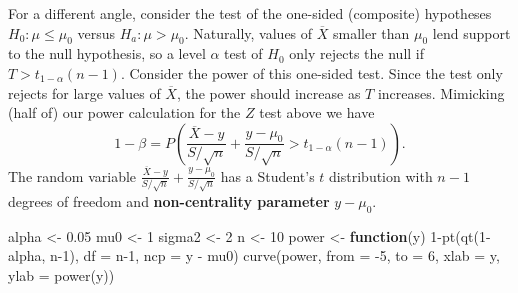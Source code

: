 \documentclass[
]{book}
\newenvironment{Shaded}{\begin{snugshade}}{\end{snugshade}}
\newcommand{\AttributeTok}[1]{\textcolor[rgb]{0.77,0.63,0.00}{#1}}
\newcommand{\ControlFlowTok}[1]{\textcolor[rgb]{0.13,0.29,0.53}{\textbf{#1}}}
\newcommand{\DecValTok}[1]{\textcolor[rgb]{0.00,0.00,0.81}{#1}}
\newcommand{\FloatTok}[1]{\textcolor[rgb]{0.00,0.00,0.81}{#1}}
\newcommand{\FunctionTok}[1]{\textcolor[rgb]{0.00,0.00,0.00}{#1}}
\newcommand{\NormalTok}[1]{#1}
\newcommand{\OtherTok}[1]{\textcolor[rgb]{0.56,0.35,0.01}{#1}}
\newcommand{\SpecialCharTok}[1]{\textcolor[rgb]{0.00,0.00,0.00}{#1}}
\newcommand{\StringTok}[1]{\textcolor[rgb]{0.31,0.60,0.02}{#1}}
\begin{document}
For a different angle, consider the test of the one-sided (composite) hypotheses \(H_0:\mu \leq \mu_0\) versus \(H_a:\mu > \mu_0\). Naturally, values of \(\overline X\) smaller than \(\mu_0\) lend support to the null hypothesis, so a level \(\alpha\) test of \(H_0\) only rejects the null if \(T > t_{1-\alpha}(n-1)\). Consider the power of this one-sided test. Since the test only rejects for large values of \(\overline X\), the power should increase as \(T\) increases. Mimicking (half of) our power calculation for the \(Z\) test above we have
\[1-\beta = P\left(\frac{\overline X - y}{S/\sqrt{n}} + \frac{y - \mu_0}{S/\sqrt{n}} > t_{1-\alpha}(n-1)\right).\]
The random variable \(\frac{\overline X - y}{S/\sqrt{n}} + \frac{y - \mu_0}{S/\sqrt{n}}\) has a Student's \(t\) distribution with \(n-1\) degrees of freedom and \textbf{non-centrality parameter} \(y-\mu_0\).

\begin{Shaded}
\begin{Highlighting}[]
\NormalTok{alpha }\OtherTok{\textless{}{-}} \FloatTok{0.05}
\NormalTok{mu0 }\OtherTok{\textless{}{-}} \DecValTok{1}
\NormalTok{sigma2 }\OtherTok{\textless{}{-}} \DecValTok{2}
\NormalTok{n }\OtherTok{\textless{}{-}} \DecValTok{10}
\NormalTok{power }\OtherTok{\textless{}{-}} \ControlFlowTok{function}\NormalTok{(y)  }\DecValTok{1}\SpecialCharTok{{-}}\FunctionTok{pt}\NormalTok{(}\FunctionTok{qt}\NormalTok{(}\DecValTok{1}\SpecialCharTok{{-}}\NormalTok{alpha, n}\DecValTok{{-}1}\NormalTok{), }\AttributeTok{df =}\NormalTok{ n}\DecValTok{{-}1}\NormalTok{, }\AttributeTok{ncp =}\NormalTok{ y }\SpecialCharTok{{-}}\NormalTok{ mu0)}
\FunctionTok{curve}\NormalTok{(power, }\AttributeTok{from =} \SpecialCharTok{{-}}\DecValTok{5}\NormalTok{, }\AttributeTok{to =} \DecValTok{6}\NormalTok{, }\AttributeTok{xlab =} \StringTok{\textquotesingle{}y\textquotesingle{}}\NormalTok{, }\AttributeTok{ylab =} \StringTok{\textquotesingle{}power(y)\textquotesingle{}}\NormalTok{)  }
\end{Highlighting}
\end{Shaded}
\end{document}
